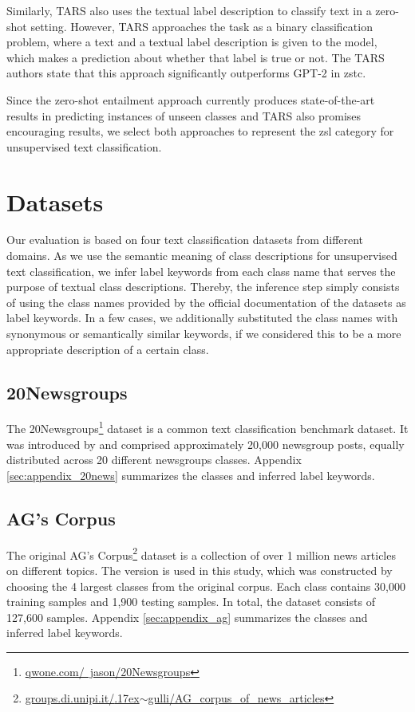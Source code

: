 \documentclass[sigconf]{acmart}
\begin{document}
Similarly, TARS \cite{halder-etal-2020-task} also uses the textual label description to classify text in a zero-shot setting. However, TARS approaches the task as a binary classification problem, where a text and a textual label description is given to the model, which makes a prediction about whether that label is true or not. The TARS authors state that this approach significantly outperforms GPT-2 \cite{Radford2019LanguageMA} in \ac{zstc}.

Since the zero-shot entailment approach currently produces state-of-the-art results in predicting instances of unseen classes and TARS also promises encouraging results, we select both approaches to represent the \ac{zsl} category for unsupervised text classification.


\section{Datasets}\label{sec:datasets}

Our evaluation is based on four text classification datasets from different domains. As we use the semantic meaning of class descriptions for unsupervised text classification, we infer label keywords from each class name that serves the purpose of textual class descriptions. Thereby, the inference step simply consists of using the class names provided by the official documentation of the datasets as label keywords. In a few cases, we additionally substituted the class names with synonymous or semantically similar keywords, if we considered this to be a more appropriate description of a certain class.

\subsection{20Newsgroups}\label{sec:20news}
The 20Newsgroups\footnote{\href{http://qwone.com/~jason/20Newsgroups}{qwone.com/~jason/20Newsgroups}} dataset is a common text classification benchmark dataset. It was introduced by \citet{Lang95} and comprised approximately 20,000 newsgroup posts, equally distributed across 20 different newsgroups classes. Appendix \ref{sec:appendix_20news} summarizes the classes and inferred label keywords.

\subsection{AG's Corpus}\label{sec:agcorpus}
The original AG's Corpus\footnote{\href{http://groups.di.unipi.it/~gulli/AG_corpus_of_news_articles}{groups.di.unipi.it/{\raise.17ex\hbox{$\scriptstyle\sim$}}gulli/AG\_corpus\_of\_news\_articles}} dataset is a collection of over 1 million news articles on different topics. The \citet{10.5555/2969239.2969312} version is used in this study, which was constructed by choosing the 4 largest classes from the original corpus. Each class contains 30,000 training samples and 1,900 testing samples. In total, the dataset consists of 127,600 samples. Appendix \ref{sec:appendix_ag} summarizes the classes and inferred label keywords.
\end{document}

